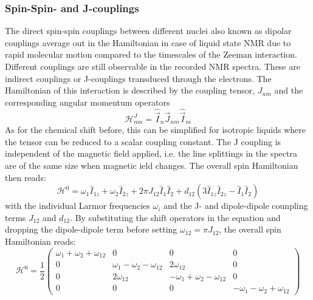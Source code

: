        \subsubsection{Spin-Spin- and J-couplings}
            The direct spin-spin couplings between different nuclei also known as dipolar couplings average out in the Hamiltonian in case of liquid state NMR due to rapid molecular motion compared to the timescales of the Zeeman interaction. Different couplings are still observable in the recorded NMR spectra. These are indirect couplings or J-couplings transduced through the electrons. The Hamiltonian of this interaction is described by the coupling tensor, $J_{nm}$ and the corresponding angular momentum operators
            \begin{equation}
                \mathcal{H}^J_{nm} = \hat{\vec I}_n \vec J_{nm} \hat{\vec I}_m
            \end{equation}
            As for the chemical shift before, this can be simplified for isotropic liquids where the tensor can be reduced to a scalar coupling constant. The J coupling is independent of the magnetic field applied, i.e. the line splittings in the spectra are of the same size when magnetic ield changes. The overall spin Hamiltonian then reads:
            \begin{equation}
                \mathcal{H}^0 = \omega_1\hat{I}_{1z} + \omega_2\hat{I}_{2z} + 2\pi J_{12}\hat{I}_1\hat{I}_2 + d_{12}(3\hat{I}_{1z}\hat{I}_{2z} - \hat{I}_1\hat{I}_2)
            \end{equation}
            with the individual Larmor frequencies $\omega_i$ and the J- and dipole-dipole counpling terms $J_{12}$ and $d_{12}$.
            By substituting the shift operators in the equation and dropping the dipole-dipole term before setting $\omega_{12} = \pi J_{12}$, the overall spin Hamiltonian reads:
            \begin{equation}
                \mathcal{H}^0 = \frac{1}{2}
                \begin{pmatrix}
                    \omega_1+\omega_2+\omega_{12} & 0 & 0 & 0\\
                    0 & \omega_1-\omega_2-\omega_{12} & 2\omega_{12} & 0 \\
                    0 & 2\omega_{12} & -\omega_1+\omega_2-\omega_{12} & 0\\
                    0 & 0 & 0 & -\omega_1-\omega_2+\omega_{12}
                \end{pmatrix}
            \end{equation}
